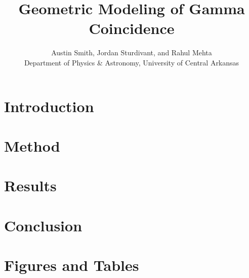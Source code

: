 \documentclass[12pt, letterpaper, twocolumn]{article}
\title{Geometric Modeling of Gamma Coincidence}
\author{Austin Smith, Jordan Sturdivant, and Rahul Mehta\\
Department of Physics \& Astronomy, University of Central Arkansas
}
\date{}
\begin{document}
\frenchspacing
\maketitle{}
\section{Introduction}

\section{Method}

\section{Results}

\section{Conclusion}

\newpage
\section{Figures and Tables}

\newpage
\printbibliography
\end{document}
